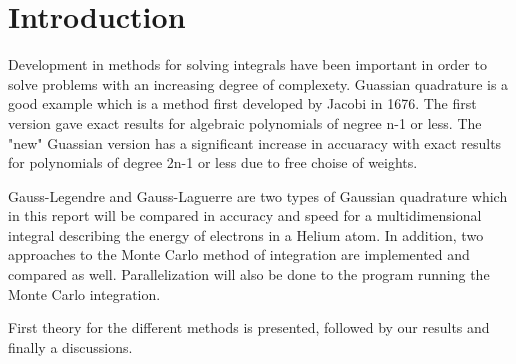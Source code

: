 \documentclass[../main.tex]{subfiles}
\begin{document}
\section{Introduction} \label{sec:intro}
Development in methods for solving integrals have been important in order to solve problems with an increasing degree of complexety. Guassian quadrature is a good example which is a method first developed by Jacobi in 1676. The first version gave exact results for algebraic polynomials of negree n-1 or less. The "new" Guassian version has a significant increase in accuaracy with exact results for polynomials of degree 2n-1 or less due to free choise of weights.

Gauss-Legendre and Gauss-Laguerre are two types of Gaussian quadrature which in this report will be compared in accuracy and speed for a multidimensional integral describing the energy of electrons in a Helium atom. In addition, two approaches to the Monte Carlo method of integration are implemented and compared as well. Parallelization will also be done to the program running the Monte Carlo integration.

First theory for the different methods is  presented, followed by our results and finally a discussions.
\end{document}

